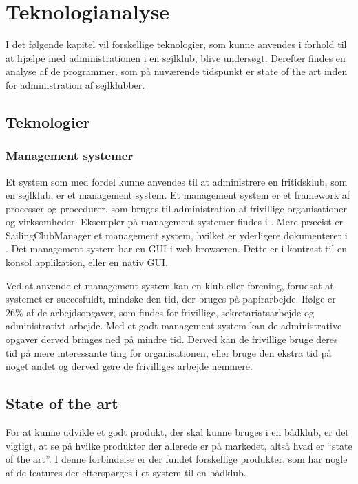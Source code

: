 \chapter{Teknologianalyse}\label{chap:teknologi-analyse}

I det følgende kapitel vil forskellige teknologier, som kunne anvendes i forhold til at hjælpe med
administrationen i en sejlklub, blive undersøgt. Derefter findes en analyse af de programmer, som på nuværende
tidspunkt er state of the art inden for administration af sejlklubber.

\section{Teknologier}

\subsection{Management systemer}\label{subsec:management-systemer}

Et system som med fordel kunne anvendes til at administrere en fritidsklub, som en sejlklub, er et management system. Et management system er et
framework af processer og procedurer, som bruges til administration af frivillige organisationer og
virksomheder. 
Eksempler på management systemer findes i . 
Mere præcist er SailingClubManager et management system, hvilket er yderligere dokumenteret i . Det management system har en \ac{GUI} i web browseren. Dette er i kontrast til en konsol applikation, eller en nativ \ac{GUI}.

Ved at anvende et management system kan en klub eller forening, forudsat at systemet er succesfuldt, mindske den
tid, der bruges på papirarbejde. Ifølge
\citet{Frivilligrapporten} er 26\% af de arbejdsopgaver, som findes for frivillige, sekretariatsarbejde og
administrativt arbejde. 
Med et godt management system kan de administrative opgaver derved bringes ned på mindre tid. 
Derved kan de frivillige bruge deres tid på mere interessante ting for organisationen, eller bruge den ekstra tid på noget andet og derved gøre de frivilliges arbejde nemmere.


\section{State of the art}\label{sec:sota}

For at kunne udvikle et godt produkt, der skal kunne bruges i en bådklub, er det vigtigt, at se på hvilke
produkter der allerede er på markedet, altså hvad er ``state of the art''. 
I denne forbindelse er der fundet forskellige produkter, som har nogle af de features der efterspørges i et system til en bådklub.


